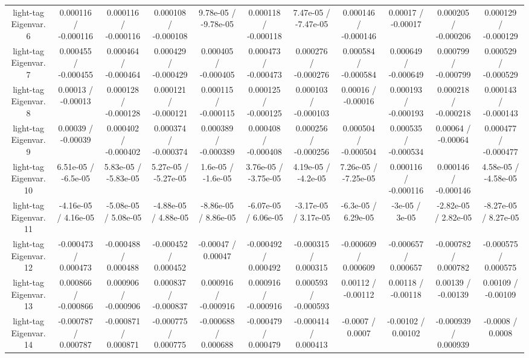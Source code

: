 \begin{table}[htbp]
\begin{center}
\begin{tabular}{|c|c|c|c|c|c|c|c|c|c|c|}
  light-tag Eigenvar. 6 & 0.000116 / -0.000116 & 0.000116 / -0.000116 & 0.000108 / -0.000108 & 9.78e-05 / -9.78e-05 & 0.000118 / -0.000118 & 7.47e-05 / -7.47e-05 & 0.000146 / -0.000146 & 0.00017 / -0.00017 & 0.000205 / -0.000206 & 0.000129 / -0.000129 \\ 
  light-tag Eigenvar. 7 & 0.000455 / -0.000455 & 0.000464 / -0.000464 & 0.000429 / -0.000429 & 0.000405 / -0.000405 & 0.000473 / -0.000473 & 0.000276 / -0.000276 & 0.000584 / -0.000584 & 0.000649 / -0.000649 & 0.000799 / -0.000799 & 0.000529 / -0.000529 \\ 
  light-tag Eigenvar. 8 & 0.00013 / -0.00013 & 0.000128 / -0.000128 & 0.000121 / -0.000121 & 0.000115 / -0.000115 & 0.000125 / -0.000125 & 0.000103 / -0.000103 & 0.00016 / -0.00016 & 0.000193 / -0.000193 & 0.000218 / -0.000218 & 0.000143 / -0.000143 \\ 
  light-tag Eigenvar. 9 & 0.00039 / -0.00039 & 0.000402 / -0.000402 & 0.000374 / -0.000374 & 0.000389 / -0.000389 & 0.000408 / -0.000408 & 0.000256 / -0.000256 & 0.000504 / -0.000504 & 0.000535 / -0.000534 & 0.00064 / -0.00064 & 0.000477 / -0.000477 \\ 
  light-tag Eigenvar. 10 & 6.51e-05 / -6.5e-05 & 5.83e-05 / -5.83e-05 & 5.27e-05 / -5.27e-05 & 1.6e-05 / -1.6e-05 & 3.76e-05 / -3.75e-05 & 4.19e-05 / -4.2e-05 & 7.26e-05 / -7.25e-05 & 0.000116 / -0.000116 & 0.000146 / -0.000146 & 4.58e-05 / -4.58e-05 \\ 
  light-tag Eigenvar. 11 & -4.16e-05 / 4.16e-05 & -5.08e-05 / 5.08e-05 & -4.88e-05 / 4.88e-05 & -8.86e-05 / 8.86e-05 & -6.07e-05 / 6.06e-05 & -3.17e-05 / 3.17e-05 & -6.3e-05 / 6.29e-05 & -3e-05 / 3e-05 & -2.82e-05 / 2.82e-05 & -8.27e-05 / 8.27e-05 \\ 
  light-tag Eigenvar. 12 & -0.000473 / 0.000473 & -0.000488 / 0.000488 & -0.000452 / 0.000452 & -0.00047 / 0.00047 & -0.000492 / 0.000492 & -0.000315 / 0.000315 & -0.000609 / 0.000609 & -0.000657 / 0.000657 & -0.000782 / 0.000782 & -0.000575 / 0.000575 \\ 
  light-tag Eigenvar. 13 & 0.000866 / -0.000866 & 0.000906 / -0.000906 & 0.000837 / -0.000837 & 0.000916 / -0.000916 & 0.000916 / -0.000916 & 0.000593 / -0.000593 & 0.00112 / -0.00112 & 0.00118 / -0.00118 & 0.00139 / -0.00139 & 0.00109 / -0.00109 \\ 
  light-tag Eigenvar. 14 & -0.000787 / 0.000787 & -0.000871 / 0.000871 & -0.000775 / 0.000775 & -0.000688 / 0.000688 & -0.000479 / 0.000479 & -0.000414 / 0.000413 & -0.0007 / 0.0007 & -0.00102 / 0.00102 & -0.000939 / 0.000939 & -0.0008 / 0.0008 \\ 

\end{tabular}
\end{center}
\end{table}
